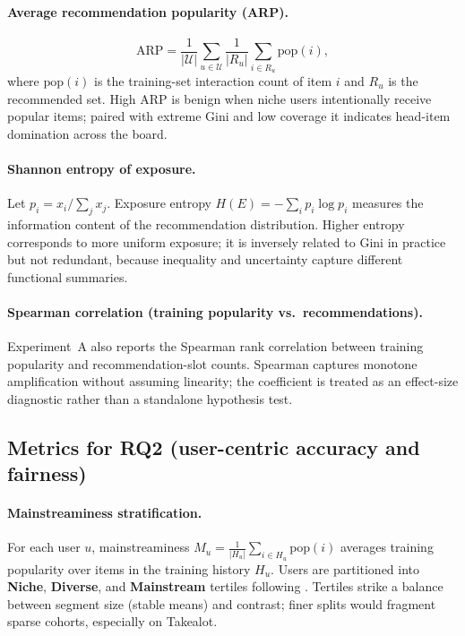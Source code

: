 \paragraph{Average recommendation popularity (ARP).}
\begin{equation}
  \textrm{ARP} = \frac{1}{|\mathcal{U}|}\sum_{u \in \mathcal{U}} \frac{1}{|R_u|}\sum_{i \in R_u} \textrm{pop}(i),
\end{equation}
where $\textrm{pop}(i)$ is the training-set interaction count of item $i$ and $R_u$ is the recommended set. High ARP is benign when niche users intentionally receive popular items; paired with extreme Gini and low coverage it indicates head-item domination across the board.

\paragraph{Shannon entropy of exposure.}
Let $p_i = x_i / \sum_j x_j$. Exposure entropy $H(E)=-\sum_i p_i\log p_i$ measures the information content of the recommendation distribution. Higher entropy corresponds to more uniform exposure; it is inversely related to Gini in practice but not redundant, because inequality and uncertainty capture different functional summaries.

\paragraph{Spearman correlation (training popularity vs.\ recommendations).}
Experiment~A also reports the Spearman rank correlation between training popularity and recommendation-slot counts. Spearman captures monotone amplification without assuming linearity; the coefficient is treated as an effect-size diagnostic rather than a standalone hypothesis test.

\subsection{Metrics for RQ2 (user-centric accuracy and fairness)}
\label{sec:method_metrics_rq2}

\paragraph{Mainstreaminess stratification.}
For each user $u$, mainstreaminess $M_u = \frac{1}{|H_u|}\sum_{i\in H_u} \text{pop}(i)$ averages training popularity over items in the training history $H_u$. Users are partitioned into \textbf{Niche}, \textbf{Diverse}, and \textbf{Mainstream} tertiles following \citet{abdollahpouri2021usercentered}. Tertiles strike a balance between segment size (stable means) and contrast; finer splits would fragment sparse cohorts, especially on Takealot.

